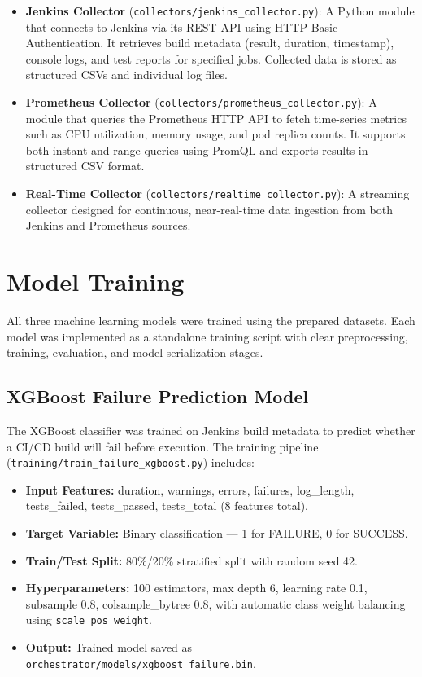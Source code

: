 \documentclass[12pt]{report}
\begin{document}
\begin{itemize}
    \item \textbf{Jenkins Collector} (\texttt{collectors/jenkins\_collector.py}): A Python module that connects to Jenkins via its REST API using HTTP Basic Authentication. It retrieves build metadata (result, duration, timestamp), console logs, and test reports for specified jobs. Collected data is stored as structured CSVs and individual log files.
    
    \item \textbf{Prometheus Collector} (\texttt{collectors/prometheus\_collector.py}): A module that queries the Prometheus HTTP API to fetch time-series metrics such as CPU utilization, memory usage, and pod replica counts. It supports both instant and range queries using PromQL and exports results in structured CSV format.
    
    \item \textbf{Real-Time Collector} (\texttt{collectors/realtime\_collector.py}): A streaming collector designed for continuous, near-real-time data ingestion from both Jenkins and Prometheus sources.
\end{itemize}

\section{Model Training}

All three machine learning models were trained using the prepared datasets. Each model was implemented as a standalone training script with clear preprocessing, training, evaluation, and model serialization stages.

\subsection{XGBoost Failure Prediction Model}

The XGBoost classifier was trained on Jenkins build metadata to predict whether a CI/CD build will fail before execution. The training pipeline (\texttt{training/train\_failure\_xgboost.py}) includes:

\begin{itemize}
    \item \textbf{Input Features:} duration, warnings, errors, failures, log\_length, tests\_failed, tests\_passed, tests\_total (8 features total).
    \item \textbf{Target Variable:} Binary classification --- 1 for FAILURE, 0 for SUCCESS.
    \item \textbf{Train/Test Split:} 80\%/20\% stratified split with random seed 42.
    \item \textbf{Hyperparameters:} 100 estimators, max depth 6, learning rate 0.1, subsample 0.8, colsample\_bytree 0.8, with automatic class weight balancing using \texttt{scale\_pos\_weight}.
    \item \textbf{Output:} Trained model saved as \texttt{orchestrator/models/xgboost\_failure.bin}.
\end{itemize}
\end{document}
